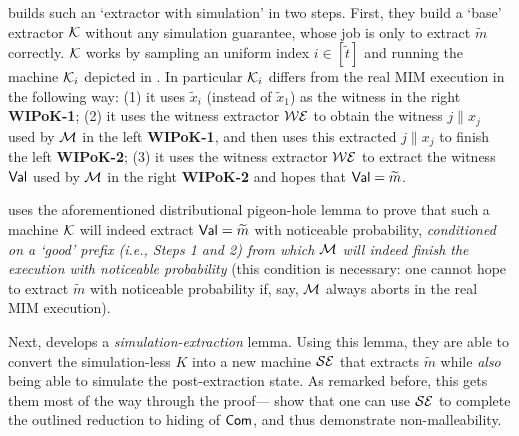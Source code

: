 \cite{FOCS:LPY23} builds such an `extractor with simulation' in two steps. First, they build a `base' extractor $\mathcal{K}$ without any simulation guarantee, whose job is only to extract $\tilde{m}$ correctly. $\mathcal{K}$ works by sampling an uniform index $i \in [\tilde{t}]$ and running the machine $\mathcal{K}_i$ depicted in . In particular $\mathcal{K}_i$ differs from the real MIM execution in the following way: (1) it uses $\tilde{x}_i$ (instead of $\tilde{x}_1$) as the witness in the right {\bf WIPoK-1}; (2) it uses the witness extractor $\mathcal{WE}$ to obtain the witness $j\|x_j$ used by $\mathcal{M}$ in the left {\bf WIPoK-1}, and then uses this extracted $j\|x_j$ to finish the left {\bf WIPoK-2}; (3) it uses the witness extractor $\mathcal{WE}$ to extract the witness $\mathsf{Val}$ used by $\mathcal{M}$ in the right {\bf WIPoK-2} and hopes that $\mathsf{Val} = \widetilde{m}$.

 \cite{FOCS:LPY23} uses the aforementioned distributional pigeon-hole lemma to prove that such a machine $\mathcal{K}$ will indeed extract $\mathsf{Val} =\widetilde{m}$ with noticeable probability, {\em conditioned on a `good' prefix (i.e., Steps 1 and 2) from which $\mathcal{M}$ will indeed finish the execution with noticeable probability} (this condition is necessary: one cannot hope to extract $\tilde{m}$ with noticeable probability if, say, $\mathcal{M}$ always aborts in the real MIM execution).



Next, \cite{FOCS:LPY23} develops a {\em simulation-extraction} lemma. Using this lemma, they are able to convert the simulation-less $K$ into a new machine $\mathcal{SE}$ that extracts $\tilde{m}$ while {\em also} being able to simulate the post-extraction state. 
  As remarked before, this gets them most of the way through the proof---\cite{FOCS:LPY23} show that one can use $\mathcal{SE}$ to complete the outlined reduction to hiding of $\mathsf{Com}$, and thus demonstrate non-malleability.




\iffalse

